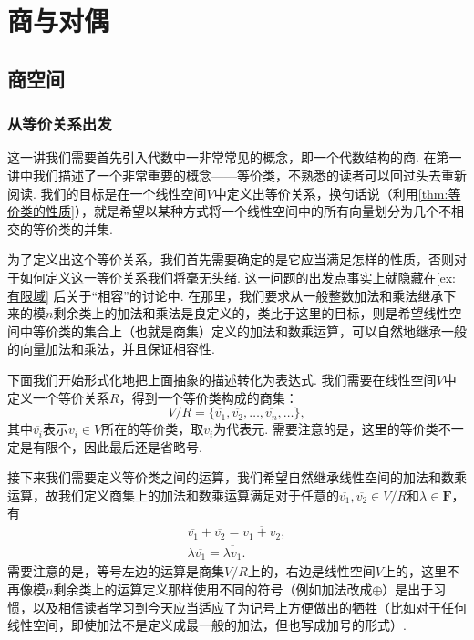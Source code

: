 \chapter{商与对偶}

\section{商空间}

\subsection{从等价关系出发}

这一讲我们需要首先引入代数中一非常常见的概念，即一个代数结构的商. 在第一讲中我们描述了一个非常重要的概念——等价类，不熟悉的读者可以回过头去重新阅读. 我们的目标是在一个线性空间$V$中定义出等价关系，换句话说（利用\autoref{thm:等价类的性质}），就是希望以某种方式将一个线性空间中的所有向量划分为几个不相交的等价类的并集.

为了定义出这个等价关系，我们首先需要确定的是它应当满足怎样的性质，否则对于如何定义这一等价关系我们将毫无头绪. 这一问题的出发点事实上就隐藏在\autoref{ex:有限域} 后关于``相容''的讨论中. 在那里，我们要求从一般整数加法和乘法继承下来的模$n$剩余类上的加法和乘法是良定义的，类比于这里的目标，则是希望线性空间中等价类的集合上（也就是商集）定义的加法和数乘运算，可以自然地继承一般的向量加法和乘法，并且保证相容性.

下面我们开始形式化地把上面抽象的描述转化为表达式. 我们需要在线性空间$V$中定义一个等价关系$R$，得到一个等价类构成的商集：
\[V/R=\{\overline{v_1},\overline{v_2},\ldots,\overline{v_n},\ldots\},\]
其中$\overline{v_i}$表示$v_i\in V$所在的等价类，取$v_i$为代表元. 需要注意的是，这里的等价类不一定是有限个，因此最后还是省略号.

接下来我们需要定义等价类之间的运算，我们希望自然继承线性空间的加法和数乘运算，故我们定义商集上的加法和数乘运算满足对于任意的$\overline{v_1},\overline{v_2}\in V/R$和$\lambda\in\mathbf{F}$，有
\begin{equation} \label{eq:10:商集运算}
    \begin{gathered}
        \overline{v_1}+\overline{v_2}=\overline{v_1+v_2},\\
        \lambda\overline{v_1}=\overline{\lambda v_1}.
    \end{gathered}
\end{equation}
需要注意的是，等号左边的运算是商集$V/R$上的，右边是线性空间$V$上的，这里不再像模$n$剩余类上的运算定义那样使用不同的符号（例如加法改成$\oplus$）是出于习惯，以及相信读者学习到今天应当适应了为记号上方便做出的牺牲（比如对于任何线性空间，即使加法不是定义成最一般的加法，但也写成加号的形式）.


